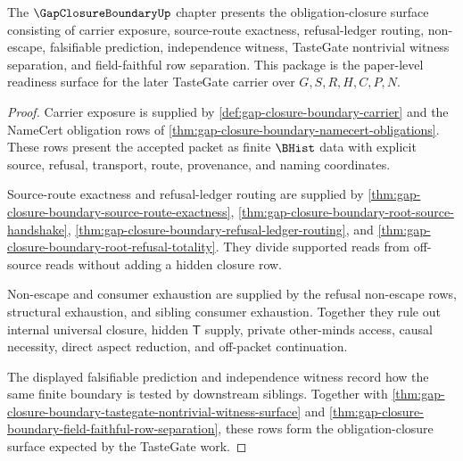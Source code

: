 \begin{theorem}
\label{thm:gap-closure-boundary-ai-obligation-readiness-package}
The $\GapClosureBoundaryUp$ chapter presents the obligation-closure surface consisting of carrier exposure, source-route exactness, refusal-ledger routing, non-escape, falsifiable prediction, independence witness, TasteGate nontrivial witness separation, and field-faithful row separation. This package is the paper-level readiness surface for the later TasteGate carrier over $G,S,R,H,C,P,N$.
\end{theorem}
\begin{proof}
Carrier exposure is supplied by \autoref{def:gap-closure-boundary-carrier} and the NameCert obligation rows of \autoref{thm:gap-closure-boundary-namecert-obligations}. These rows present the accepted packet as finite $\BHist$ data with explicit source, refusal, transport, route, provenance, and naming coordinates.

Source-route exactness and refusal-ledger routing are supplied by \autoref{thm:gap-closure-boundary-source-route-exactness}, \autoref{thm:gap-closure-boundary-root-source-handshake}, \autoref{thm:gap-closure-boundary-refusal-ledger-routing}, and \autoref{thm:gap-closure-boundary-root-refusal-totality}. They divide supported reads from off-source reads without adding a hidden closure row.

Non-escape and consumer exhaustion are supplied by the refusal non-escape rows, structural exhaustion, and sibling consumer exhaustion. Together they rule out internal universal closure, hidden $\mathsf{T}$ supply, private other-minds access, causal necessity, direct aspect reduction, and off-packet continuation.

The displayed falsifiable prediction and independence witness record how the same finite boundary is tested by downstream siblings. Together with \autoref{thm:gap-closure-boundary-tastegate-nontrivial-witness-surface} and \autoref{thm:gap-closure-boundary-field-faithful-row-separation}, these rows form the obligation-closure surface expected by the TasteGate work.
\end{proof}



